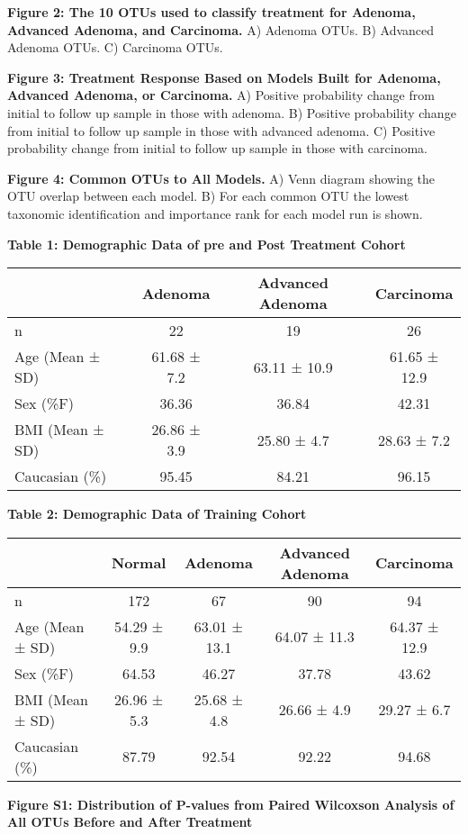 \documentclass[12pt,]{article}
\begin{document}
\textbf{Figure 2: The 10 OTUs used to classify treatment for Adenoma,
Advanced Adenoma, and Carcinoma.} A) Adenoma OTUs. B) Advanced Adenoma
OTUs. C) Carcinoma OTUs.

\textbf{Figure 3: Treatment Response Based on Models Built for Adenoma,
Advanced Adenoma, or Carcinoma.} A) Positive probability change from
initial to follow up sample in those with adenoma. B) Positive
probability change from initial to follow up sample in those with
advanced adenoma. C) Positive probability change from initial to follow
up sample in those with carcinoma.

\textbf{Figure 4: Common OTUs to All Models.} A) Venn diagram showing
the OTU overlap between each model. B) For each common OTU the lowest
taxonomic identification and importance rank for each model run is
shown.

\newpage

\textbf{Table 1: Demographic Data of pre and Post Treatment Cohort}

\begin{longtable}[]{@{}lccc@{}}
\toprule
& Adenoma & Advanced Adenoma & Carcinoma\tabularnewline
\midrule
\endhead
n & 22 & 19 & 26\tabularnewline
Age (Mean ± SD) & 61.68 ± 7.2 & 63.11 ± 10.9 & 61.65 ±
12.9\tabularnewline
Sex (\%F) & 36.36 & 36.84 & 42.31\tabularnewline
BMI (Mean ± SD) & 26.86 ± 3.9 & 25.80 ± 4.7 & 28.63 ± 7.2\tabularnewline
Caucasian (\%) & 95.45 & 84.21 & 96.15\tabularnewline
\bottomrule
\end{longtable}

\newpage

\textbf{Table 2: Demographic Data of Training Cohort}

\begin{longtable}[]{@{}lcccc@{}}
\toprule
& Normal & Adenoma & Advanced Adenoma & Carcinoma\tabularnewline
\midrule
\endhead
n & 172 & 67 & 90 & 94\tabularnewline
Age (Mean ± SD) & 54.29 ± 9.9 & 63.01 ± 13.1 & 64.07 ± 11.3 & 64.37 ±
12.9\tabularnewline
Sex (\%F) & 64.53 & 46.27 & 37.78 & 43.62\tabularnewline
BMI (Mean ± SD) & 26.96 ± 5.3 & 25.68 ± 4.8 & 26.66 ± 4.9 & 29.27 ±
6.7\tabularnewline
Caucasian (\%) & 87.79 & 92.54 & 92.22 & 94.68\tabularnewline
\bottomrule
\end{longtable}

\newpage

\textbf{Figure S1: Distribution of P-values from Paired Wilcoxson
Analysis of All OTUs Before and After Treatment}
\end{document}
